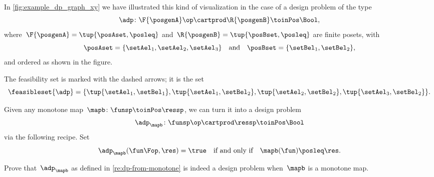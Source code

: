 \begin{marginfigure}
    \centering
    \caption{}
    \label{fig:example_dp_graph_xy}
\end{marginfigure}

\begin{example}
    \label{exa:visualize-dp}
    In \cref{fig:example_dp_graph_xy} we have illustrated this kind of visualization in the case of a design problem of the type
    \begin{equation*}
        \adp \colon \F{\posgenA} \op \cartprod  \R{\posgenB} \toinPos \Bool,
    \end{equation*}
    where~$\F{\posgenA} = \tup{\posAset, \posleq}$ and~$ \R{\posgenB} = \tup{\posBset, \posleq}$ are finite posets, with
    \begin{equation}
        \posAset = \{ \setAel_1, \setAel_2, \setAel_3 \}
        \quad \text{and} \quad
        \posBset =  \{ \setBel_1, \setBel_2\},
    \end{equation}
    and ordered as shown in the figure.

    The feasibility set is marked with the dashed arrows; it is the set
    \begin{equation*}
        \feasibleset{\adp} = \{\tup{\setAel_1, \setBel_1}, \tup{\setAel_1, \setBel_2}, \tup{\setAel_2, \setBel_2}, \tup{\setAel_3, \setBel_2} \}.
    \end{equation*}
\end{example}

\begin{remark}
    \label{re:dp-from-monotone}
    Given any monotone map~$\mapb\colon \funsp \toinPos \ressp$, we can turn it into a design problem
    \begin{equation*}
        \adp_\mapb \colon \funsp\op \cartprod \ressp \toinPos \Bool
    \end{equation*}
    via the following recipe.
    Set
    \begin{equation*}
        \adp_\mapb (\fun\Fop, \res) = \true \quad \text{if and only if} \quad \mapb(\fun) \posleq \res.
    \end{equation*}
\end{remark}

\begin{exercise}
    \label{ex:adp-monotone}
    Prove that~$\adp_\mapb$ as defined in \cref{re:dp-from-monotone} is indeed a design problem when~$\mapb$ is a monotone map.
\end{exercise}

